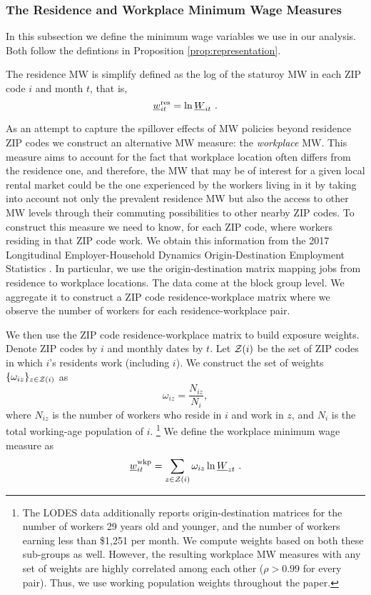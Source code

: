 \subsubsection*{The Residence and Workplace Minimum Wage Measures}

In this subsection we define the minimum wage variables we use in our analysis.
Both follow the defintions in Proposition \ref{prop:representation}.

The residence MW is simplify defined as the log of the staturoy MW in each
ZIP code $i$ and month $t$, that is,
\begin{equation*}
    \mw^{\res}_{it} = \ln \MW_{it} \ .
\end{equation*}

As an attempt to capture the spillover effects of MW policies beyond residence 
ZIP codes we construct an alternative MW measure: the \textit{workplace} MW. 
This measure aims to account for the fact that workplace location often differs 
from the residence one, and therefore, the MW that may be of interest for 
a given local rental market could be the one experienced by the workers living 
in it by taking into account not only the prevalent residence MW but also the 
access to other MW levels through their commuting possibilities to other nearby 
ZIP codes.
To construct this measure we need to know, for each ZIP code, where workers 
residing in that ZIP code work.
We obtain this information from the 2017 Longitudinal Employer-Household 
Dynamics Origin-Destination Employment Statistics \parencite[LODES;][]{LODES}.
In particular, we use the origin-destination matrix mapping jobs from residence
to workplace locations. The data come at the block group level.
We aggregate it to construct a ZIP code residence-workplace matrix where we 
observe the number of workers for each residence-workplace pair.

We then use the ZIP code residence-workplace matrix to build exposure weights.
Denote ZIP codes by $i$ and monthly dates by $t$. Let $\mathcal{Z}(i)$ be the set of ZIP 
codes in which $i$'s residents work (including $i$). We construct the set of 
weights $\{\omega_{iz}\}_{z\in\mathcal{Z}(i)}$ as 
$$\omega_{iz} = \frac{N_{iz}}{N_i} , $$
where 
$N_{iz}$ is the number of workers who reside in $i$ and work in $z$, 
and $N_i$ is the total working-age population of $i$.%
\footnote{The LODES data additionally reports origin-destination matrices for 
the number of workers 29 years old and younger, and the number of workers 
earning less than \$1,251 per month.
We compute weights based on both these sub-groups as well.
However, the resulting workplace MW measures with any set of weights are highly
correlated among each other ($\rho>0.99$ for every pair).
Thus, we use working population weights throughout the paper.}
We define the workplace minimum wage measure as
\begin{equation}
    \underline{w}^{\text{wkp}}_{it} = \sum_{z\in\mathcal{Z}(i)} \omega_{iz} \ln \underline{W}_{zt} \ .
\end{equation}

